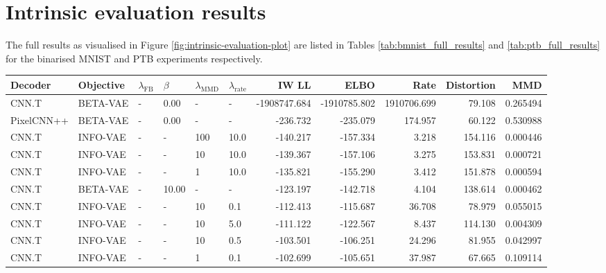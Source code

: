 \section{Intrinsic evaluation results}\label{app:intrinsic-evaluation}

The full results as visualised in Figure \ref{fig:intrinsic-evaluation-plot} are listed in Tables \ref{tab:bmnist_full_results} and \ref{tab:ptb_full_results} for the binarised MNIST and PTB experiments respectively.

\begin{table}[!htb]
    \centering
    \scriptsize
    \begin{tabular}{llllll|rrrrr}
    \toprule
    Decoder & Objective & $\lambda_{\text{FB}}$ &  $\beta$ & $\lambda_{\text{MMD}}$ & $\lambda_{\text{rate}}$ &    IW LL &     ELBO &    Rate &  Distortion &        MMD \\
\midrule
      CNN.T &  BETA-VAE &         - &  0.00 &     - &      - & -1908747.684 & -1910785.802 & 1910706.699 &      79.108 &   0.265494 \\
 PixelCNN++ &  BETA-VAE &         - &  0.00 &     - &      - &     -236.732 &     -235.079 &     174.957 &      60.122 &   0.530988 \\
      CNN.T &  INFO-VAE &         - &      - &   100 & 10.0 &     -140.217 &     -157.334 &       3.218 &     154.116 &   0.000446 \\
      CNN.T &  INFO-VAE &         - &      - &    10 & 10.0 &     -139.367 &     -157.106 &       3.275 &     153.831 &   0.000721 \\
      CNN.T &  INFO-VAE &         - &      - &     1 & 10.0 &     -135.821 &     -155.290 &       3.412 &     151.878 &   0.000594 \\
      CNN.T &  BETA-VAE &         - & 10.00 &     - &      - &     -123.197 &     -142.718 &       4.104 &     138.614 &   0.000462 \\
      CNN.T &  INFO-VAE &         - &      - &    10 &  0.1 &     -112.413 &     -115.687 &      36.708 &      78.979 &   0.055015 \\
      CNN.T &  INFO-VAE &         - &      - &    10 &  5.0 &     -111.122 &     -122.567 &       8.437 &     114.130 &   0.004309 \\
      CNN.T &  INFO-VAE &         - &      - &    10 &  0.5 &     -103.501 &     -106.251 &      24.296 &      81.955 &   0.042997 \\
      CNN.T &  INFO-VAE &         - &      - &     1 &  0.1 &     -102.699 &     -105.651 &      37.987 &      67.665 &   0.109114 \\

\end{tabular}
\end{table}

